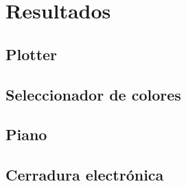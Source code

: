 \newpage

\section{Resultados}
\subsection{Plotter}

\subsection{Seleccionador de colores}

\subsection{Piano}

\subsection{Cerradura electrónica}
